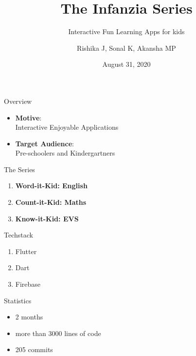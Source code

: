 \documentclass[14pt]{beamer}
\title[Infanzia]{The Infanzia Series}
\subtitle{Interactive Fun Learning Apps for kids}
\author[Team 16]{Rishika J, Sonal K, Akansha MP}
\date{August 31, 2020}
\begin{document}
\begin{frame}
    \titlepage
\end{frame}


\begin{frame}{Overview}
    \pause
    \begin{itemize}
    \item \textbf{Motive}: \\
            Interactive Enjoyable Applications
        \pause
    \item \textbf{Target Audience}: \\
            Pre-schoolers and Kindergartners
    \end{itemize}
\end{frame}


\begin{frame}[standout]
    \alert{The Series}
\end{frame}


\begin{frame}
    \begin{enumerate}
        \item \textbf{Word-it-Kid: English} \\
    \pause
        \item \textbf{Count-it-Kid: Maths} \\
    \pause
        \item \textbf{Know-it-Kid: EVS} 
    \end{enumerate}
\end{frame}


\begin{frame}{Techstack}
    \pause
    \begin{enumerate}
        \item Flutter
    \pause
        \item Dart
    \pause
        \item Firebase  
    \end{enumerate}
\end{frame}


\begin{frame}{Statistics}
    \pause
    \begin{itemize}
        \item 2 months
            \pause
        \item more than 3000 lines of code
            \pause
        \item 205 commits
    \end{itemize}
\end{frame}
\end{document}
